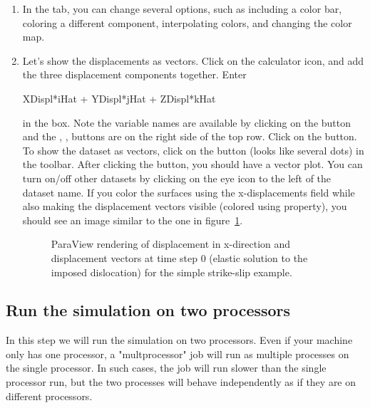 \begin{enumerate}
\item In the  tab, you can change several options,
  such as including a color bar, coloring a different component,
  interpolating colors, and changing the color map.
\item Let's show the displacements as vectors. Click on the calculator
  icon, and add the three displacement components together. Enter
  \begin{screen}
  XDispl*iHat + YDispl*jHat + ZDispl*kHat
  \end{screen}
  in the  box. Note the variable names are
  available by clicking on the  button and the
  , ,  buttons are on
  the right side of the top row. Click on the 
  button. To show the dataset as vectors, click on the
   button (looks like several dots) in the toolbar.
  After clicking the  button, you should have a
  vector plot. You can turn on/off other datasets by clicking on the
  eye icon to the left of the dataset name. If you color the surfaces
  using the x-displacements field while also making the displacement
  vectors visible (colored using property), you should see an image
  similar to the one in figure~\ref{fig:splitcube:xdisp:vec:t0}.

  \begin{figure}[htbp]
    \begin{center}
      \caption{ParaView rendering of displacement in x-direction and
        displacement vectors at time step 0 (elastic solution to the
        imposed dislocation) for the simple strike-slip example.}
      \label{fig:splitcube:xdisp:vec:t0}
    \end{center}
  \end{figure}      

\end{enumerate}

\subsection{Run the simulation on two processors}

In this step we will run the simulation on two processors. Even if
your machine only has one processor, a "multprocessor" job will run as
multiple processes on the single processor. In such cases, the job
will run slower than the single processor run, but the two processes
will behave independently as if they are on different processors.


